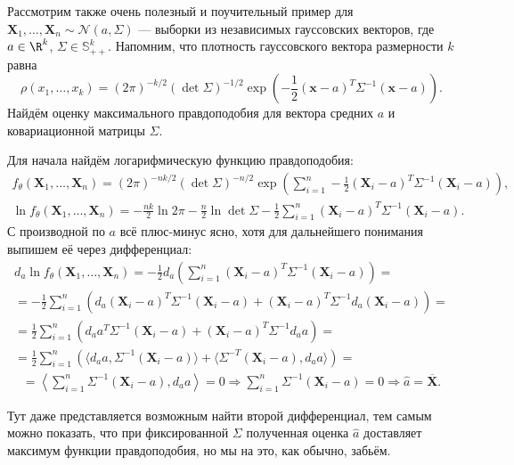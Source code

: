 \begin{example}\label{mle_for_multivariate_normal}
Рассмотрим также очень полезный и поучительный пример для $\mathbf X_1, \ldots, \mathbf X_n \sim \mathcal N (a,\Sigma)$ --- выборки из независимых гауссовских векторов, где $a \in \R^{k}$, $\Sigma \in \mathbb{S}^k_{++}$. Напомним, что плотность гауссовского вектора размерности $k$ равна
\[
\rho(x_1, \ldots, x_k) = (2\pi)^{-k/2}(\det{\Sigma})^{-1/2}\exp{\left(-\frac{1}{2}(\mathbf{x}-a)^T\Sigma^{-1}(\mathbf{x}-a)\right)}.
\]
Найдём оценку максимального правдоподобия для вектора средних $a$ и ковариационной матрицы $\Sigma$.

Для начала найдём логарифмическую функцию правдоподобия:
\begin{gather*}
    f_{\theta}(\mathbf X_1, \ldots, \mathbf X_n) = (2\pi)^{-nk/2}(\det{\Sigma})^{-n/2}\exp{\left(\sum_{i=1}^n-\frac{1}{2}(\mathbf X_i-a)^T\Sigma^{-1}(\mathbf X_i-a)\right)},\\
    \ln{f_{\theta}(\mathbf X_1, \ldots, \mathbf X_n)} = -\frac{nk}{2}\ln{2\pi} - \frac{n}{2}\ln{\det{\Sigma}} - \frac{1}{2}\sum_{i=1}^n (\mathbf X_i-a)^T\Sigma^{-1}(\mathbf X_i-a).
\end{gather*}
С производной по $a$ всё плюс-минус ясно, хотя для дальнейшего понимания выпишем её через дифференциал:
\begin{gather*}
d_a \ln{f_{\theta}(\mathbf X_1, \ldots, \mathbf X_n)} = - \frac{1}{2} d_a\left( \sum_{i=1}^n (\mathbf X_i-a)^T\Sigma^{-1}(\mathbf X_i-a)\right) =\\
= - \frac{1}{2}\sum_{i=1}^n\left(d_a(\mathbf X_i-a)^T\Sigma^{-1}(\mathbf X_i-a) + (\mathbf X_i-a)^T\Sigma^{-1}d_a(\mathbf X_i-a)\right) =\\
= \frac{1}{2}\sum_{i=1}^n\left(d_a a^T\Sigma^{-1}(\mathbf X_i-a) + (\mathbf X_i-a)^T\Sigma^{-1}d_a a\right) = \\
= \frac{1}{2}\sum_{i=1}^n\left(\langle d_a a, \Sigma^{-1}(\mathbf X_i-a) \rangle+ \langle \Sigma^{-T}(\mathbf X_i-a), d_a a \rangle \right) =
\end{gather*}
\begin{gather*}
=\left< \sum_{i=1}^n \Sigma^{-1}(\mathbf X_i-a), d_a a \right> = 0 \Longrightarrow \sum_{i=1}^n \Sigma^{-1}(\mathbf X_i-a) = 0 \Longrightarrow \widehat{a} = \overline{\mathbf X}.
\end{gather*}

Тут даже представляется возможным найти второй дифференциал, тем самым можно показать, что при фиксированной $\Sigma$ полученная оценка $\widehat{a}$ доставляет максимум функции правдоподобия, но мы на это, как обычно, забьём.


\end{example}
